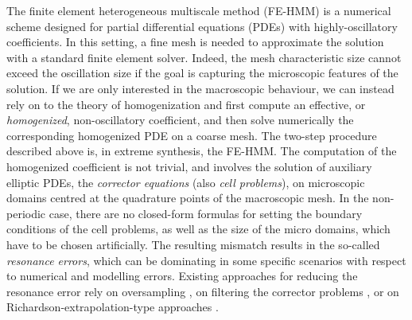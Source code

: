 \documentclass[10pt]{article}
\begin{document}
The finite element heterogeneous multiscale method (FE-HMM) \cite{Abd05b,EE03} is a numerical scheme designed for partial differential equations (PDEs) with highly-oscillatory coefficients. In this setting, a fine mesh is needed to approximate the solution with a standard finite element solver. Indeed, the mesh characteristic size cannot exceed the oscillation size if the goal is capturing the microscopic features of the solution. If we are only interested in the macroscopic behaviour, we can instead rely on to the theory of homogenization \cite{BLP78,CiD99} and first compute an effective, or \textit{homogenized}, non-oscillatory coefficient, and then solve numerically the corresponding homogenized PDE on a coarse mesh. The two-step procedure described above is, in extreme synthesis, the FE-HMM. The computation of the homogenized coefficient is not trivial, and involves the solution of auxiliary elliptic PDEs, the \textit{corrector equations} (also \textit{cell problems}), on microscopic domains centred at the quadrature points of the macroscopic mesh. In the non-periodic case, there are no closed-form formulas for setting the boundary conditions of the cell problems, as well as the size of the micro domains, which have to be chosen artificially. The resulting mismatch results in the so-called \textit{resonance errors}, which can be dominating in some specific scenarios with respect to numerical and modelling errors. Existing approaches for reducing the resonance error rely on oversampling \cite{YuE07}, on filtering the corrector problems \cite{BlL10}, or on Richardson-extrapolation-type approaches \cite{GlH16}.
 
\end{document}
